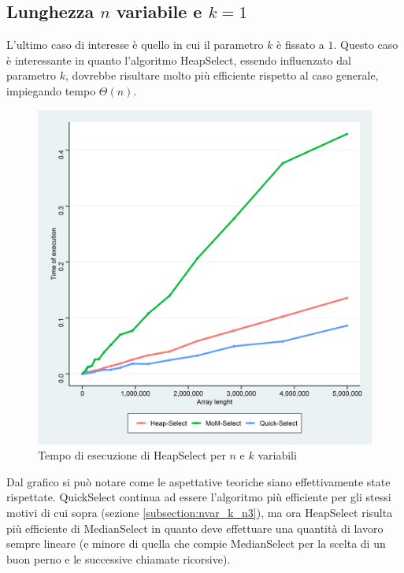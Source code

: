 \documentclass{article}
\begin{document}
	\newpage
	
	
	\subsection{Lunghezza $n$ variabile e $k=1$}
	L'ultimo caso di interesse è quello in cui il parametro $k$ è fissato a $1$. Questo caso è interessante in quanto l'algoritmo HeapSelect, essendo influenzato dal parametro $k$, dovrebbe risultare molto più efficiente rispetto al caso generale, impiegando tempo $\Theta\left(n\right)$.
	
	\begin{figure}[h!]
  		\includegraphics[width=\linewidth]{images/Grafico_Con_K1.png}
  		\caption{Tempo di esecuzione di HeapSelect per $n$ e $k$ variabili}
  		\label{fig:graph6}
	\end{figure}
	
	Dal grafico si può notare come le aspettative teoriche siano effettivamente state rispettate. QuickSelect continua ad essere l'algoritmo più efficiente per gli stessi motivi di cui sopra (sezione \ref{subsection:nvar_k_n3}), ma ora HeapSelect risulta più efficiente di MedianSelect in quanto deve effettuare una quantità di lavoro sempre lineare (e minore di quella che compie MedianSelect per la scelta di un buon perno e le successive chiamate ricorsive).
	
\end{document}
